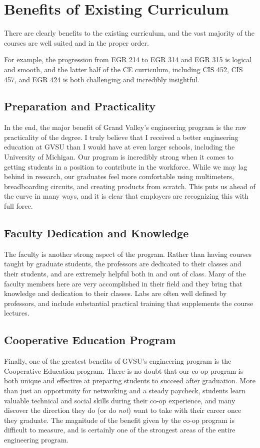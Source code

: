 \documentclass[12pt]{article}
\numberwithin{figure}{section}
\numberwithin{equation}{section}
\begin{document}
{\newpage
\section{Benefits of Existing Curriculum}\label{benefits}
There are clearly benefits to the existing curriculum, and the vast
majority of the courses are well suited and in the proper order.

\bigskip

For example, the progression from EGR 214 to EGR 314
and EGR 315 is logical and smooth, and the latter half of the
CE curriculum, including CIS 452, CIS 457, and
EGR 424 is both challenging and incredibly insightful.

\subsection{Preparation and Practicality}\label{preparation-and-practicality}
In the end, the major benefit of Grand Valley's engineering program is
the raw practicality of the degree. I truly believe that I received a
better engineering education at GVSU than I would have at even larger
schools, including the University of Michigan. Our program is incredibly
strong when it comes to getting students in a position to contribute in
the workforce. While we may lag behind in research, our graduates feel
more comfortable using multimeters, breadboarding circuits, and creating
products from scratch. This puts us ahead of the curve in many ways, and
it is clear that employers are recognizing this with full force.

\subsection{Faculty Dedication and Knowledge}\label{faculty-dedication-and-knowledge}
The faculty is another strong aspect of the program. Rather than having
courses taught by graduate students, the professors are dedicated to
their classes and their students, and are extremely helpful both in and
out of class. Many of the faculty members here are very accomplished in
their field and they bring that knowledge and dedication to their
classes. Labs are often well defined by professors, and include
substantial practical training that supplements the course lectures.

\subsection{Cooperative Education Program}\label{cooperative-education-program}
Finally, one of the greatest benefits of GVSU's engineering program is
the Cooperative Education program. There is no doubt that our co-op
program is both unique and effective at preparing students to succeed
after graduation. More than just an opportunity for networking and a
steady paycheck, students learn valuable technical and social skills
during their co-op experience, and many discover the direction they do
(or do \emph{not}) want to take with their career once they graduate.
The magnitude of the benefit given by the co-op program is difficult to
measure, and is certainly one of the strongest areas of the entire
engineering program.

}
\end{document}
